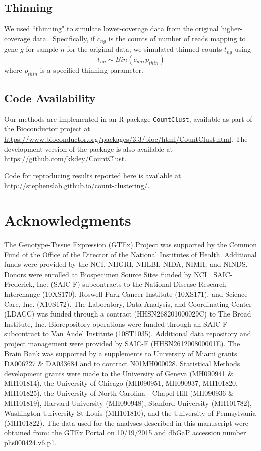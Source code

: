 \documentclass[10pt,letterpaper]{article}
\begin{document}
\subsection*{Thinning}

We used ``thinning" to simulate lower-coverage data from the original higher-coverage data..
Specifically, if $c_{ng}$ is the counts of number of reads mapping to gene $g$ for sample $n$ for the original data, we simulated
thinned counts $t_{ng}$ using
\begin{equation}
t_{ng} \sim Bin (c_{ng}, p_{thin})
\end{equation}
where $p_{thin}$ is a specified thinning parameter.


\subsection*{Code Availability}

Our methods are implemented in an R package {\tt CountClust}, available as part of the Bioconductor project at \url{https://www.bioconductor.org/packages/3.3/bioc/html/CountClust.html}. The development version of the package is also available at \url{https://github.com/kkdey/CountClust}.

Code for reproducing results reported here is available at \url{http://stephenslab.github.io/count-clustering/}.


\section*{Acknowledgments}

The Genotype-Tissue Expression (GTEx) Project was supported by the Common Fund of the Office of the Director of the National Institutes of Health. Additional funds were provided by the NCI, NHGRI, NHLBI, NIDA, NIMH, and NINDS. Donors were enrolled at Biospecimen Source Sites funded by NCI $\ $ SAIC-Frederick, Inc. (SAIC-F) subcontracts to the National Disease Research Interchange (10XS170), Roswell Park Cancer Institute (10XS171), and Science Care, Inc. (X10S172). The Laboratory, Data Analysis, and Coordinating Center (LDACC) was funded through a contract (HHSN268201000029C) to The Broad Institute, Inc. Biorepository operations were funded through an SAIC-F subcontract to Van Andel Institute (10ST1035). Additional data repository and project management were provided by SAIC-F (HHSN261200800001E). The Brain Bank was supported by a supplements to University of Miami grants DA006227 $\&$ DA033684 and to contract N01MH000028. Statistical Methods development grants were made to the University of Geneva (MH090941 $\&$ MH101814), the University of Chicago (MH090951, MH090937, MH101820, MH101825), the University of North Carolina - Chapel Hill (MH090936 $\&$ MH101819), Harvard University (MH090948), Stanford University (MH101782), Washington University St Louis (MH101810), and the University of Pennsylvania (MH101822). The data used for the analyses described in this manuscript were obtained from: the GTEx Portal on 10/19/2015 and  dbGaP accession number phs000424.v6.p1.
\end{document}
